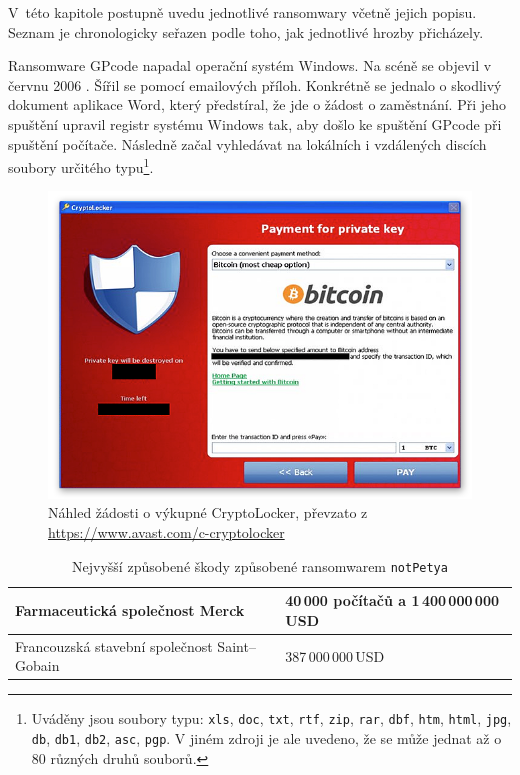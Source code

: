 \documentclass[a4paper,12pt]{article}
\begin{document}
V~této kapitole postupně uvedu jednotlivé ransomwary včetně jejich popisu. Seznam je chronologicky seřazen podle toho, jak jednotlivé hrozby přicházely.

Ransomware GPcode napadal operační systém Windows. Na scéně se objevil v červnu 2006 \cite{gpcode-knowbe4}. Šířil se pomocí emailových příloh. Konkrétně se jednalo o skodlivý dokument aplikace Word, který předstíral, že jde o žádost o zaměstnání. Při jeho spuštění upravil registr systému Windows tak, aby došlo ke spuštění GPcode při spuštění počítače. Následně začal vyhledávat na lokálních i vzdálených discích soubory určitého typu\footnote{Uváděny \cite{gpcode-fsecure} jsou soubory typu: \texttt{xls}, \texttt{doc}, \texttt{txt}, \texttt{rtf}, \texttt{zip}, \texttt{rar}, \texttt{dbf}, \texttt{htm}, \texttt{html}, \texttt{jpg}, \texttt{db}, \texttt{db1}, \texttt{db2}, \texttt{asc}, \texttt{pgp}.  V jiném zdroji \cite{gpcode-riskfront} je ale uvedeno, že se může jednat až o 80 různých druhů souborů.}.


\begin{figure}
	\begin{center}
		\includegraphics[scale=0.6]{clocker1}
		\caption{Náhled žádosti o výkupné CryptoLocker, převzato z \url{https://www.avast.com/c-cryptolocker}}
		\label{fig:clocker1}
	\end{center}
\end{figure}


\begin{table}[h]
	\begin{center}
		\caption{Nejvyšší způsobené škody způsobené ransomwarem \texttt{notPetya}}
		\vspace{0.3cm}
		\begin{tabular}{m{22em}m{8em}}
			\toprule
			Farmaceutická společnost Merck \cite{merck} & 40\,000 počítačů a 1\,400\,000\,000\,USD \\
			\midrule
			Francouzská stavební společnost Saint--Gobain \cite{sweek} & 387\,000\,000\,USD \\
			\bottomrule
		\end{tabular}
		\label{notpetya-impacts}
	\end{center}
\end{table}
\end{document}
